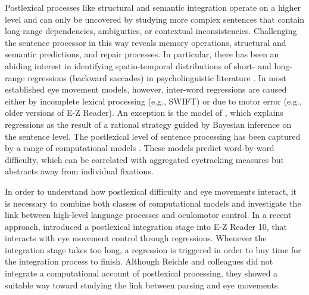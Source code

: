 Postlexical processes  like structural and semantic integration operate on a higher level and can only be uncovered by studying more complex sentences that contain long-range dependencies, ambiguities, or contextual inconsistencies.  Challenging the sentence processor in this way reveals memory operations, structural and semantic predictions, and repair processes.
In particular, there has been an abiding interest in identifying spatio-temporal distributions of short- and long-range regressions (backward saccades) in psycholinguistic literature \cite{vanDyke2003,FrazierRayner1982,MalsburgVasishth2011,MalsburgVasishth2012,Meseguer2002,MitchellEtAl2008,Weger2007}. 
In most established eye movement models, however, inter-word regressions are caused either by incomplete lexical processing (e.g., SWIFT) or due to motor error (e.g., older versions of E-Z Reader).  An exception is the model of \cite{BicknellLevy2010a}, which explains regressions as the result of a rational strategy guided by Bayesian inference on the sentence level. 
The postlexical level of sentence processing has been captured by a range of computational models \citep{Binder2001,Elman:2005p2,Hale2011,JustCarpenter1992,Konieczny2003,Budiu2004,LewisVasishth2005,MacDonaldChristiansen2002,SpiveyTanenhaus1998,VasishthBruessowLewis2008}.  These models predict word-by-word difficulty, which can be correlated with aggregated eyetracking measures but abstracts away from individual fixations.

In order to understand how postlexical difficulty and eye movements interact, it is necessary to combine both classes of computational models and investigate the link between high-level language processes and oculomotor control.  In a recent approach, \cite{ReichleWarrenMcConnell2009} introduced a postlexical integration stage into E-Z Reader 10, that interacts with eye movement control through regressions.  Whenever the integration stage takes too long, a regression is triggered in order to buy time for the integration process to finish.  Although Reichle and colleagues did not integrate a computational account of postlexical processing, they showed a suitable way toward studying the link between parsing and eye movements.

